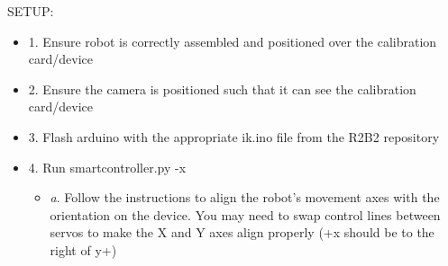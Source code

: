 \documentclass[a4paper,12pt]{letter}
\begin{document}
SETUP:
\begin{itemize}
\item 1. Ensure robot is correctly assembled and positioned over the calibration card/device
\item 2. Ensure the camera is positioned such that it can see the calibration card/device
\item 3. Flash arduino with the appropriate ik.ino file from the R2B2 repository
\item 4. Run smartcontroller.py -x
\begin{itemize}
\item \emph{a}. Follow the instructions to align the robot's movement axes with the orientation on the device. You may need to swap control lines between servos to make the X and Y axes align properly (+x should be to the right of y+)
\end{itemize}
\end{itemize}
\end{document}
